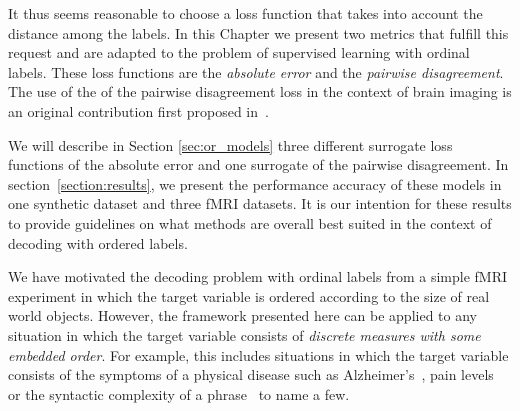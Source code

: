 It thus seems reasonable to choose a loss function that takes into account the distance among the labels. In this Chapter we present two metrics that fulfill this request and are adapted to the problem of supervised learning with ordinal labels. These loss functions are the \emph{absolute error} and the \emph{pairwise disagreement}. The use of the of the pairwise disagreement loss in the context of brain imaging is an original contribution first proposed in~\citep{pedregosa2012learning}.


We will describe in Section \ref{sec:or_models} three different surrogate loss functions of the absolute error and one surrogate of the pairwise disagreement. In section~\ref{section:results}, we present the performance accuracy of these models in one synthetic dataset and three fMRI datasets. {It is our intention for these results to provide guidelines on what methods are overall best suited in the context of decoding with ordered labels.}

We have motivated the decoding problem with ordinal labels from a simple fMRI experiment in which the target variable is ordered according to the size of real world objects. However, the framework presented here can be applied to any situation in which the target variable consists of \emph{discrete measures with some embedded order}. For example, this includes situations in which the target variable consists of the symptoms of a physical disease such as Alzheimer's~\citep{mueller2005ways}, pain levels~\citep{PAPR:PAPR3034} or the syntactic complexity of a phrase~\citep{pallier2011cortical} to name a few.







